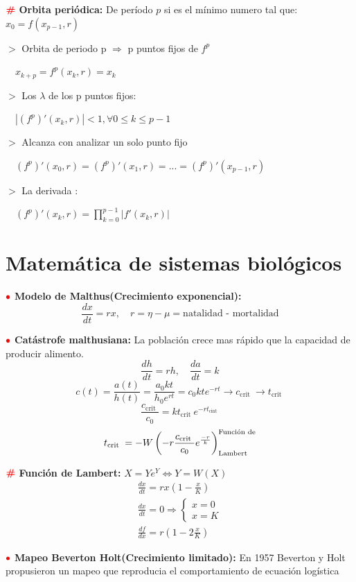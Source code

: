 \documentclass[%
 reprint,
 amsmath,amssymb,
 aps,
]{revtex4-1}
\newcommand{\definir}{\color{red}{\textbf{\#}}}
\newcommand{\tema}{\color{red}{\bullet}}
\begin{document}
$\definir$ \textbf{Orbita periódica:} 
De período $p$ si es el mínimo numero tal que: $
x_0 = f(x_{p-1},r)
$

$>$ Orbita de periodo p $\Rightarrow$ p puntos fijos de $f^p$ 

$\quad x_{k+p} = f^p(x_{k},r) = x_{k}$ 

$>$ Los $\lambda$ de los p puntos fijos:

$\quad | (f^p)'(x_k, r) | < 1, \forall 0 \leq k \leq p-1$

$>$ Alcanza con analizar un solo punto fijo

$\quad (f^p)'(x_0, r) =
(f^p)'(x_1, r) =
... =
(f^p)'(x_{p-1}, r)$

$>$ La derivada :

$\quad (f^p)'(x_k, r) = 
\prod_{k=0}^{p-1} 
|f ' (x_k, r)|
$

\section{Matemática de sistemas biológicos}

$\tema$ \textbf{Modelo de Malthus(Crecimiento exponencial):}
$$
\frac{d x}{d t}=r x, \quad 
r=\eta-\mu = \text{natalidad - mortalidad}
$$

$\tema$ \textbf{Catástrofe malthusiana:} 
La población crece mas rápido que la capacidad de producir alimento.
$$
\frac{dh}{dt} = rh, \quad \frac{da}{dt} = k
$$
$$
c(t)=\frac{a(t)}{h(t)}=\frac{a_{0} k t}{h_{0} e^{r t}}=c_{0} k t e^{-r t} \rightarrow c_{\text {crit }} \rightarrow t_{\text {crit }}
$$
$$
\frac{c_{\text {crit }}}{c_{0}}
=k t_{\text {crit }} e^{-r t_{\text {cint }}} 
$$
$$
t_{\text {crit }}
=-W\left(-r \frac{c_{\text {crit }}}{c_{0}} e^{-r \over k}\right) ^\text {Función de} _\text {Lambert}
$$

$\definir$ \textbf{Función de Lambert:} 
$X=Y e^{Y} \Leftrightarrow Y=W(X)$
$$
\begin{array}{l}
\frac{d x}{d t}=r x\left(1-\frac{x}{K}\right) \\
\frac{d x}{d t}=0 \Rightarrow\left\{\begin{array}{l}
x=0 \\
x=K
\end{array}\right. \\
\frac{d f}{d x}=r\left(1-2 \frac{x}{K}\right)
\end{array}
$$

$\tema$ \textbf{Mapeo Beverton Holt(Crecimiento limitado):}
En 1957 Beverton y Holt propusieron un mapeo que reproducia el comportamiento de ecuación logística
\end{document}
